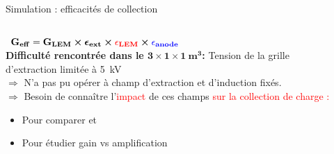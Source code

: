     \begin{frame}{Simulation : efficacités de collection}
    	\begin{scriptsize}
    		\begin{columns}
    			\hspace{-1.5cm}
	    		\begin{column}{0.3\textwidth}
	    			\vspace{-2cm}
	    			\hbox{
	    				$\mathbf{G_{eff}=G_{LEM}\boldsymbol{\times}\boldsymbol{\epsilon}_{ext} \boldsymbol{\times}\textcolor{red}{\epsilon_{LEM}}\boldsymbol{\times} \textcolor{blue}{\epsilon_{anode}}}$
	    			}\\
	    			\vspace{0.7cm}
	    			\textbf{Difficulté rencontrée dans le $\mathbf{3 \times 1 \times \SI[detect-weight]{1}{\meter\cubed}}$:} Tension de la grille d'extraction limitée à \SI{5}{\kilo\volt}\\
	    			\vspace{0.3cm}
	    			$\Rightarrow$ N'a pas pu opérer à champ d'extraction et d'induction fixés.\\
	    			$\Rightarrow$ Besoin de connaître l'\textcolor{red}{impact} de ces champs \textcolor{red}{sur la collection de charge : }\\
	    			\begin{itemize}
                        \item Pour comparer \TOO{} et \threeL{}
                        \item Pour étudier gain vs amplification
                    \end{itemize}
	    		\end{column}\hfill\hspace{-3.2cm}
	    		\begin{column}{0.65\textwidth}

\end{column}
\end{columns}
\end{scriptsize}
\end{frame}
